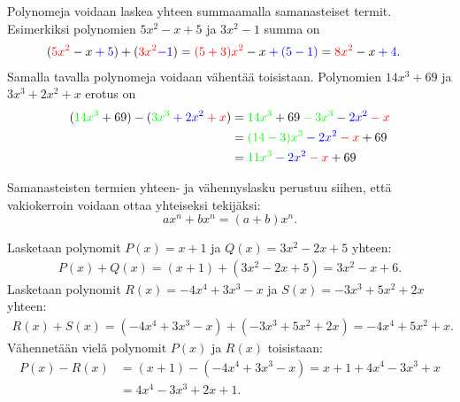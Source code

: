 
Polynomeja voidaan laskea yhteen summaamalla samanasteiset termit. Esimerkiksi polynomien $5x^2-x+5$ ja $3x^2-1$ summa on
   \begin{align*}
        (\textcolor{red}{5x^2}-x\textcolor{blue}{{}+5})+(\textcolor{red}{3x^2}\textcolor{blue}{-1}) &=\textcolor{red}{(5+3)x^2}-x\textcolor{blue}{{}+(5-1)}=\textcolor{red}{8x^2}-x\textcolor{blue}{{}+4}.
    \end{align*}
Samalla tavalla polynomeja voidaan vähentää toisistaan. Polynomien
$14x^3+69$ ja $3x^3+2x^2+x$ erotus on
    \begin{align*}
        (\textcolor{green}{14x^3} + 69) - (\textcolor{green}{3x^3} \textcolor{blue}{{}+ 2x^2} \textcolor{red}{{}+x})
        &= \textcolor{green}{14x^3} + 69 \textcolor{green}{{}-3x^3} - 
            \textcolor{blue}{2x^2} \textcolor{red}{{}-x} \\
        &= \textcolor{green}{(14-3)x^3} \textcolor{blue}{{}-2x^2} \textcolor{red}{{}-x} + 69 \\
        &= \textcolor{green}{11x^3} \textcolor{blue}{{}-2x^2} \textcolor{red}{{}-x} + 69
    \end{align*}
    
Samanasteisten termien yhteen- ja vähennyslasku perustuu siihen, että vakiokerroin voidaan
ottaa yhteiseksi tekijäksi:
\[
ax^n+bx^n=(a+b)x^n.
\]
    
\begin{esimerkki}
Lasketaan polynomit
$P(x)=x+1$ ja $Q(x)=3x^2-2x+5$ yhteen:
   \begin{align*}
        P(x)+Q(x)=(x+1)+(3x^2-2x+5) =3x^2-x+6.
    \end{align*}
Lasketaan polynomit $R(x)=-4x^4+3x^3-x$ ja $S(x)=-3x^3+5x^2+2x$ yhteen:
   \begin{align*}
        R(x)+S(x)=(-4x^4+3x^3-x)+(-3x^3+5x^2+2x) =-4x^4+5x^2+x.
    \end{align*}
Vähennetään vielä polynomit $P(x)$ ja $R(x)$ toisistaan:
   \begin{align*}
        P(x)-R(x) & =(x+1)-(-4x^4+3x^3-x) =x+1+4x^4-3x^3+x \\
        & =4x^4-3x^3+2x+1.
    \end{align*}
\end{esimerkki}


